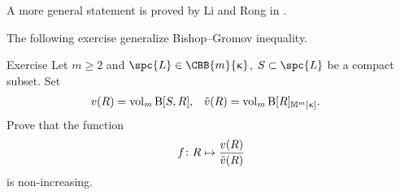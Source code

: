 A more general statement is proved by Li and Rong in \cite{li-rong}.

The following exercise generalize Bishop--Gromov inequality.

\begin{thm}{Exercise}\label{thm:bishop-gromov-gen}
Let $m\ge 2$ and 
$\spc{L}\in\CBB{m}{\kappa}$, 
$S\subset \spc{L}$ be a compact subset.
Set
\begin{align*}
v(R)&=\mathop{\rm vol}\nolimits_m\mathrm{B}{}[S,R],
&
\tilde v(R)&=\mathop{\rm vol}\nolimits_m\mathrm{B}{}[R]_{\mathbb{M}_{{}}^{m}[{\upkappa}]}.
\end{align*}
Prove that the function
\[f\:R\mapsto \frac{v(R)}{\~v(R)}\] 
is non-increasing.
\end{thm}
